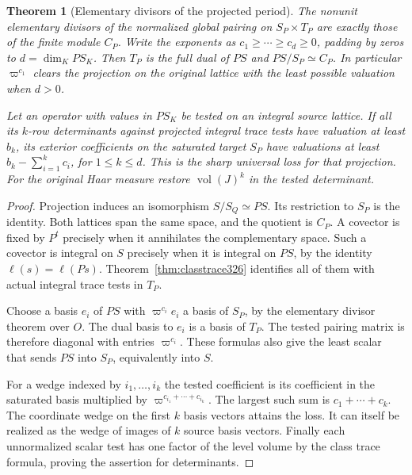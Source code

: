 \documentclass[a4paper,11pt]{article}
\newtheorem{theorem}[proposition]{Theorem}
\theoremstyle{definition}
\theoremstyle{remark}
\numberwithin{equation}{section}
\begin{document}
\begin{theorem}[Elementary divisors of the projected period]\leavevmode
\label{thm:projclass326}
The nonunit elementary divisors of the normalized global
pairing on \(S_P\times T_P\) are exactly those of the finite
module \(C_P\). Write the exponents as
\(c_1\ge\cdots\ge c_d\ge0\), padding by zeros to
\(d=\dim_K P S_K\). Then \(T_P\) is the full dual of
\(P S\) and \(P S/S_P\simeq C_P\). In particular
\(\varpi^{c_1}\) clears the projection on the original
lattice with the least possible valuation when \(d>0\).

Let an operator with values in \(P S_K\) be tested on an
integral source lattice. If all its \(k\)-row determinants
against projected integral trace tests have valuation at
least \(b_k\), its exterior coefficients on the saturated
target \(S_P\) have valuations at least
\(b_k-\sum_{i=1}^k c_i\), for \(1\le k\le d\).
This is the sharp universal loss for that projection. For
the original Haar measure restore \(\operatorname{vol}(J)^k\)
in the tested determinant.
\end{theorem}
\begin{proof}
Projection induces an isomorphism \(S/S_Q\simeq P S\).
Its restriction to \(S_P\) is the identity. Both lattices
span the same space, and the quotient is \(C_P\).
A covector is fixed by \(P^t\) precisely when it annihilates
the complementary space. Such a covector is integral on
\(S\) precisely when it is integral on \(P S\), by the
identity \(\ell(s)=\ell(Ps)\). Theorem~\ref{thm:classtrace326}
identifies all of them with actual integral trace tests
in \(T_P\).

Choose a basis \(e_i\) of \(P S\) with
\(\varpi^{c_i}e_i\) a basis of \(S_P\), by the elementary
divisor theorem over \(O\). The dual basis to \(e_i\)
is a basis of \(T_P\). The tested pairing matrix is
therefore diagonal with entries \(\varpi^{c_i}\).
These formulas also give the least scalar that sends
\(P S\) into \(S_P\), equivalently into \(S\).

For a wedge indexed by \(i_1,\ldots,i_k\) the tested
coefficient is its coefficient in the saturated basis
multiplied by \(\varpi^{c_{i_1}+\cdots+c_{i_k}}\).
The largest such sum is \(c_1+\cdots+c_k\). The coordinate
wedge on the first \(k\) basis vectors attains the loss.
It can itself be realized as the wedge of images of \(k\)
source basis vectors. Finally each unnormalized scalar
test has one factor of the level volume by the class
trace formula, proving the assertion for determinants.
\end{proof}
\end{document}
